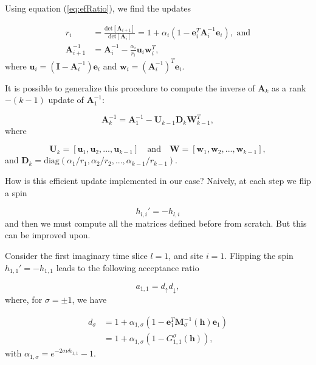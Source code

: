 \documentclass[10pt, twocolumn, twoside]{article}
\begin{document}
Using equation (\ref{eq:efRatio}), we find the updates

\begin{equation}
\begin{split}
r_i &= \frac{\text{det}[\bm A_{i+1}]}{\text{det}[\bm A_{i}]} = 1 + \alpha_i ( 1 - \bm e_i^T \bm A_i^{-1}  \bm e_i ) , \,\, \text{and} \\
\bm A_{i+1}^{-1} &= \bm A_i^{-1} - \frac{\alpha_i}{r_i} \bm u_i \bm w_i^T ,
\end{split}
\end{equation}
where $\bm u_i = (\bm I - \bm A_i^{-1} ) \bm e_i$ and $\bm w_i = (\bm A_i^{-1})^T \bm e_i$.

It is possible to generalize this procedure to compute the inverse of $\bm A_k$ as a rank$-(k-1)$ update of $\bm A_1^{-1}$:

\begin{equation}
\bm A_k^{-1} = \bm A_1^{-1} - \bm U_{k-1} \bm D_k \bm W_{k-1}^T ,
\end{equation}
where

\begin{equation}
\bm U_k = [ \bm u_1 , \bm u_2, ..., \bm u_{k-1} ] \quad \text{and} \quad \bm W = [ \bm w_1, \bm w_2, ..., \bm w_{k-1} ] ,
\end{equation}
and $\bm D_k = \text{diag}(\alpha_1 / r_1, \alpha_2 / r_2, ..., \alpha_{k-1} / r_{k-1})$.

How is this efficient update implemented in our case? Naively, at each step we flip a spin

\begin{equation*}
h_{l, i}' = -h_{l, i}
\end{equation*}
and then we must compute all the matrices defined before from scratch. But this can be improved upon.

Consider the first imaginary time slice $l=1$, and site $i = 1$. Flipping the spin $h_{1,1}' = - h_{1, 1}$ leads to the following acceptance ratio

\begin{equation}
a_{1,1} = d_\uparrow d_\downarrow ,
\end{equation}
where, for $\sigma = \pm 1$, we have

\begin{equation}
\begin{split}
d_\sigma &= 1 + \alpha_{1, \sigma} ( 1 - \bm e_1^T \bm M_\sigma^{-1} (\bm h) \bm e_1 ) \\
&= 1 + \alpha_{1, \sigma} ( 1 - G_{1, 1}^\sigma (\bm h) ) ,
\end{split}
\end{equation}
with $\alpha_{1, \sigma} = e^{-2 \sigma \nu h_{1, 1} } - 1$.
\end{document}
